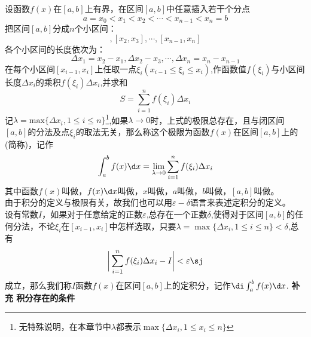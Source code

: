 \sj
{}
设函数$f(x)$在$[a,b]$上有界，在区间$[a,b]$中任意插入若干个分点
\begin{equation}
	\nonumber
	a=x_0<x_1<x_2<\cdots<x_{n-1}<x_n=b
\end{equation}
把区间$[a,b]$分成$n$个小区间：
\begin{equation}
	[x_1,x_2],[x_2,x_3],\cdots,[x_{n-1},x_n]
\end{equation}
各个小区间的长度依次为：
\begin{equation}
	\nonumber
	\Delta x_1=x_2-x_1,\Delta x_2-x_3,\cdots,\Delta x_n=x_n-x_{n-1}
\end{equation}
在每个小区间$[x_{i-1},x_i]$上任取一点$\xi_i(x_{i-1}\leq \xi_i\leq x_i)$,作函数值$f(\xi_i)$与小区间长度$\Delta x_i$的乘积$f(\xi_i)\Delta x_i$,并求和
\begin{equation}
	S=\sum_{i=1}^{n}f(\xi_i)\Delta x_i
\end{equation}
\kg 记$\lambda=\text{max}\{\Delta x_i,1\leq i\leq n\}$\footnote{无特殊说明，在本章节中$\lambda$都表示$\max \{\Delta x_i,1\leq x_i\leq n\}$},如果$\lambda\to 0$时，上式的极限总存在，且与闭区间$[a,b]$的分法及点$\xi_i$的取法无关，那么称这个极限为函数$f(x)$在区间$[a,b]$上的(简称)，记作
\begin{equation}
	\int_{a}^{b}f(x)\d x=\lim\limits_{\lambda\to0}\sum_{i=1}^{n}f(\xi_i)\Delta x_i
\end{equation}
\kg 其中函数$f(x)$叫做，$f(x)\d x$叫做，$x$叫做，$a$叫做，$b$叫做，$[a,b]$叫做。\\
\kg 由于积分的定义与极限有关，故我们也可以用$\varepsilon-\delta$语言来表述定积分的定义。
\\ \kg 设有常数$I$，如果对于任意给定的正数$\varepsilon$,总存在一个正数$\delta$,使得对于区间$[a,b]$的任何分法，不论$\xi_i$在$[x_{i-1},x_i]$中怎样选取，只要$\lambda=\max\{\Delta x_i,1\leq i\leq n\}<\delta$,总有
\begin{equation}
	\bigg|\sum_{i=1}^{n}f(\xi_i)\Delta x_i-I\bigg|<\varepsilon\sj
\end{equation}
\noindent 成立，那么我们称$I$函数$f(x)$在区间$[a,b]$上的定积分，记作$\di\int_{a}^{b}f(x)\d x$.
\warn[\kg 定积分的值只与被积函数和被积区间有关，而与积分变量的记法无关。例如
\begin{equation}
	\int_{a}^{b}f(x)\d x=\int_{a}^{b}f(t)\d t=\int_{a}^{b}f(u)\d u\sj
	\end{equation}
\kg $\di\sum_{i=1}^{n}f(\xi_i)\Delta x_i$通常称为$f(x)$的积分和。如果$f(x)$在{$[a,b]$}上的定积分存在，那么就称$f(x)$在{$[a,b]$}上可积。]
\noindent \textbf{补充\hspace{1em} 积分存在的条件}\\

